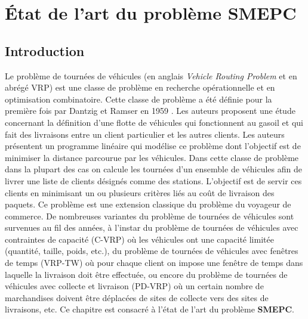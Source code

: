 \chapter{État de l'art du problème SMEPC}
\minitoc
\newpage
\label{Etat_art_probleme}
\section{Introduction}
Le problème de tournées de véhicules (en anglais \textit{Vehicle Routing Problem} et en abrégé VRP) est une classe de problème en recherche opérationnelle et en optimisation combinatoire. Cette classe de problème a été définie pour la première fois par Dantzig et Ramser en 1959 \cite{Dantzig_1959}. Les auteurs proposent une étude concernant la définition d'une flotte de véhicules qui fonctionnent au gasoil et qui fait des livraisons entre un client particulier et les autres clients. Les auteurs présentent un programme linéaire qui modélise ce problème dont l'objectif est de minimiser la distance parcourue par les véhicules. Dans cette classe de problème dans la plupart des cas on calcule les tournées d'un ensemble de véhicules afin de livrer une liste de clients désignés comme des stations. L'objectif est de servir ces clients en minimisant un ou plusieurs critères liés au coût de livraison des paquets. Ce problème est une extension classique du problème du voyageur de commerce. De nombreuses variantes du problème de tournées de véhicules sont survenues au fil des années, à l'instar du problème de tournées de véhicules avec contraintes de capacité (C-VRP) où les véhicules ont une capacité limitée (quantité, taille, poids, etc.), du problème de tournées de véhicules avec fenêtres de temps (VRP-TW) où pour chaque client on impose une fenêtre de temps dans laquelle la livraison doit être effectuée, ou encore du problème de tournées de véhicules avec collecte et livraison (PD-VRP) où un certain nombre de marchandises doivent être déplacées de sites de collecte vers des sites de livraisons, etc. Ce chapitre est consacré à l'état de l'art du problème \textbf{SMEPC}.

